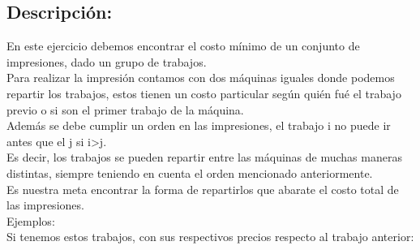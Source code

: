 \subsection{Descripción:}

En este ejercicio debemos encontrar el costo mínimo de un conjunto de impresiones, dado un grupo de trabajos.\\
Para realizar la impresión contamos con dos máquinas iguales donde podemos repartir los trabajos, estos tienen un costo particular según quién fué el trabajo previo o si son el primer trabajo de la máquina.\\
Además se debe cumplir un orden en las impresiones, el trabajo i no puede ir antes que el j si i>j.\\
Es decir, los trabajos se pueden repartir entre las máquinas de muchas maneras distintas, siempre teniendo en cuenta el orden mencionado anteriormente.\\
Es nuestra meta encontrar la forma de repartirlos que abarate el costo total de las impresiones.\\

Ejemplos:\\

Si tenemos estos trabajos, con sus respectivos precios respecto al trabajo anterior:\\
